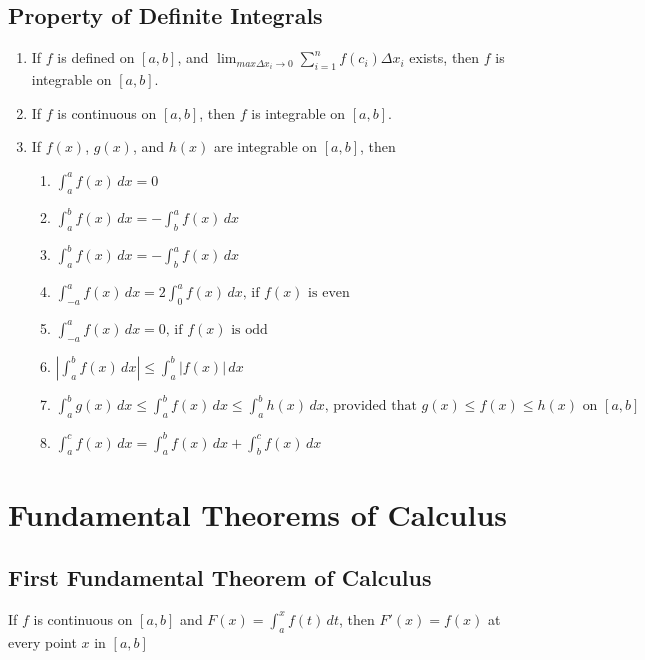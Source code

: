 \documentclass[11pt]{article}
\begin{document}
\subsection{Property of Definite Integrals}
\begin{enumerate}
    \item If $f$ is defined on $[a,b]$, and $\displaystyle\lim_{max \Delta x_i\to 0}\sum_{i=1}^{n}f(c_i)\Delta x_i$ exists, 
        then $f$ is integrable on $[a,b]$.
    \item If $f$ is continuous on $[a,b]$, then $f$ is integrable on $[a,b]$.
    \item If $f(x)$, $g(x)$, and $h(x)$ are integrable on $[a,b]$, then
    \begin{enumerate}
        \item $
            \displaystyle
            \int_a^af(x)\,dx =0
        $
        \item $
            \displaystyle
            \int_a^bf(x)\,dx =-\int_b^af(x)\,dx
        $
        \item $
            \displaystyle
            \int_a^bf(x)\,dx =-\int_b^af(x)\,dx
        $
        \item $
            \displaystyle
            \int_{-a}^af(x)\,dx =2\int_0^af(x)\,dx\text{, if $f(x)$ is even}
        $
        \item $
            \displaystyle
            \int_{-a}^af(x)\,dx =0\text{, if $f(x)$ is odd}
        $
        \item $
            \displaystyle
            \left|\int_a^bf(x)\,dx\right|\leq\int_a^b|f(x)|\,dx
        $
        \item $
            \displaystyle
            \int_a^bg(x)\,dx\leq\int_a^bf(x)\,dx\leq\int_a^bh(x)\,dx \text{, provided that } g(x)\leq f(x)\leq h(x)\text{ on }[a,b]
        $
        \item $
            \displaystyle
            \int_a^cf(x)\,dx=\int_a^bf(x)\,dx+\int_b^cf(x)\,dx
        $
    \end{enumerate}
\end{enumerate}
\section{Fundamental Theorems of Calculus}
\subsection{First Fundamental Theorem of Calculus}
If $f$ is continuous on $[a,b]$ and $\displaystyle F(x)=\int_a^xf(t)\,dt$, 
then $F'(x)=f(x)$ at every point $x$ in $[a,b]$
\end{document}
